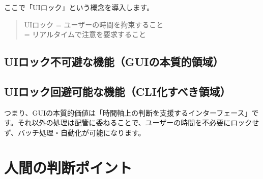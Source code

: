 \documentclass[10pt,a4paper,twocolumn]{ltjsarticle}
\begin{document}
ここで「UIロック」という概念を導入します。

\begin{quote}
UIロック = ユーザーの時間を拘束すること\\
= リアルタイムで注意を要求すること
\end{quote}

\subsection{UIロック不可避な機能（GUIの本質的領域）}

\vspace{0.5\baselineskip}
\vspace{0.5\baselineskip}

\subsection{UIロック回避可能な機能（CLI化すべき領域）}

\vspace{0.5\baselineskip}
\vspace{0.5\baselineskip}

つまり、GUIの本質的価値は「時間軸上の判断を支援するインターフェース」です。それ以外の処理は配管に委ねることで、ユーザーの時間を不必要にロックせず、バッチ処理・自動化が可能になります。

\section{人間の判断ポイント}
\end{document}
